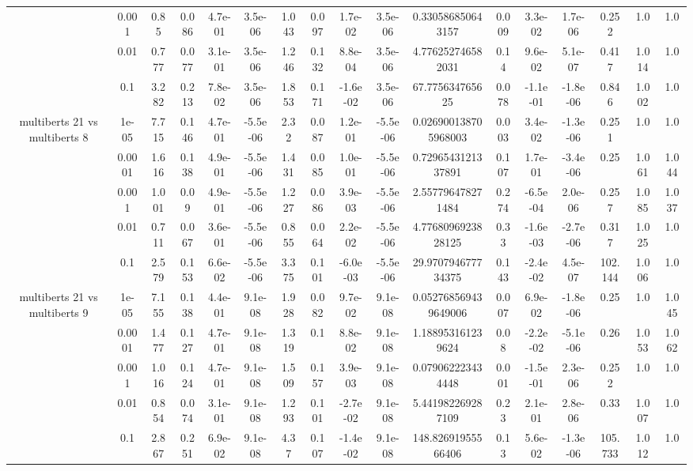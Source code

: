 \begin{tabular}{|c|c|c|c|c|c|c|c|c|c|c|c|c|c|c|c|c|}
 & 0.001 & 0.85 & 0.086 & 4.7e-01 & 3.5e-06 & 1.043 & 0.097 & 1.7e-02 & 3.5e-06 & 0.330586850643157 & 0.009 & 3.3e-02 & 1.7e-06 & 0.252 & 1.0 & 1.0 \\
 & 0.01 & 0.777 & 0.077 & 3.1e-01 & 3.5e-06 & 1.246 & 0.132 & 8.8e-04 & 3.5e-06 & 4.776252746582031 & 0.14 & 9.6e-02 & 5.1e-07 & 0.417 & 1.014 & 1.0 \\
 & 0.1 & 3.282 & 0.213 & 7.8e-02 & 3.5e-06 & 1.853 & 0.171 & -1.6e-02 & 3.5e-06 & 67.775634765625 & 0.078 & -1.1e-01 & -1.8e-06 & 0.846 & 1.002 & 1.0 \\
\hline
\multirow{5}{*}{multiberts 21 vs multiberts 8} & 1e-05 & 7.715 & 0.146 & 4.7e-01 & -5.5e-06 & 2.32 & 0.087 & 1.2e-01 & -5.5e-06 & 0.026900138705968003 & 0.003 & 3.4e-02 & -1.3e-06 & 0.251 & 1.0 & 1.0 \\
 & 0.0001 & 1.616 & 0.138 & 4.9e-01 & -5.5e-06 & 1.431 & 0.085 & 1.0e-01 & -5.5e-06 & 0.7296543121337891 & 0.107 & 1.7e-01 & -3.4e-06 & 0.25 & 1.061 & 1.044 \\
 & 0.001 & 1.001 & 0.09 & 4.9e-01 & -5.5e-06 & 1.227 & 0.086 & 3.9e-03 & -5.5e-06 & 2.557796478271484 & 0.274 & -6.5e-04 & 2.0e-06 & 0.257 & 1.085 & 1.037 \\
 & 0.01 & 0.711 & 0.067 & 3.6e-01 & -5.5e-06 & 0.855 & 0.064 & 2.2e-02 & -5.5e-06 & 4.7768096923828125 & 0.33 & -1.6e-03 & -2.7e-06 & 0.317 & 1.025 & 1.0 \\
 & 0.1 & 2.579 & 0.153 & 6.6e-02 & -5.5e-06 & 3.375 & 0.101 & -6.0e-03 & -5.5e-06 & 29.970794677734375 & 0.143 & -2.4e-02 & 4.5e-07 & 102.144 & 1.006 & 1.0 \\
\hline
\multirow{5}{*}{multiberts 21 vs multiberts 9} & 1e-05 & 7.155 & 0.138 & 4.4e-01 & 9.1e-08 & 1.928 & 0.082 & 9.7e-02 & 9.1e-08 & 0.052768569439649006 & 0.007 & 6.9e-02 & -1.8e-06 & 0.25 & 1.0 & 1.045 \\
 & 0.0001 & 1.477 & 0.127 & 4.7e-01 & 9.1e-08 & 1.319 & 0.1 & 8.8e-02 & 9.1e-08 & 1.188953161239624 & 0.08 & -2.2e-02 & -5.1e-06 & 0.26 & 1.053 & 1.062 \\
 & 0.001 & 1.016 & 0.124 & 4.7e-01 & 9.1e-08 & 1.509 & 0.157 & 3.9e-03 & 9.1e-08 & 0.079062223434448 & 0.001 & -1.5e-01 & 2.3e-06 & 0.252 & 1.0 & 1.0 \\
 & 0.01 & 0.854 & 0.074 & 3.1e-01 & 9.1e-08 & 1.293 & 0.101 & -2.7e-02 & 9.1e-08 & 5.441982269287109 & 0.23 & 2.1e-01 & 2.8e-06 & 0.33 & 1.007 & 1.0 \\
 & 0.1 & 2.867 & 0.251 & 6.9e-02 & 9.1e-08 & 4.37 & 0.107 & -1.4e-02 & 9.1e-08 & 148.82691955566406 & 0.13 & 5.6e-02 & -1.3e-06 & 105.733 & 1.012 & 1.0 \\

\end{tabular}
